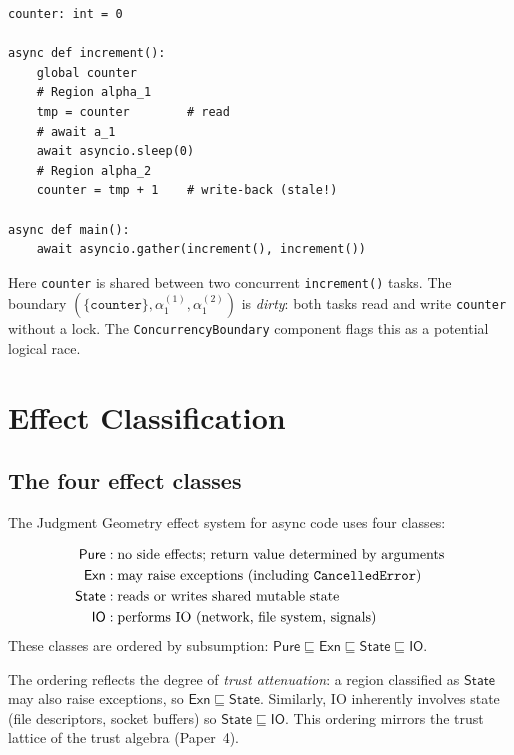 \documentclass[11pt]{article}
\newcommand{\Epure}{\mathsf{Pure}}           %
\newcommand{\Eexn}{\mathsf{Exn}}             %
\newcommand{\Estate}{\mathsf{State}}         %
\newcommand{\Eio}{\mathsf{IO}}               %
\newcommand{\asyncRegion}[1]{\alpha_{#1}}    %
\begin{document}
\begin{example}\label{ex:dirty}
\begin{lstlisting}[style=jugeo-python]
counter: int = 0

async def increment():
    global counter
    # Region alpha_1
    tmp = counter        # read
    # await a_1
    await asyncio.sleep(0)
    # Region alpha_2
    counter = tmp + 1    # write-back (stale!)

async def main():
    await asyncio.gather(increment(), increment())
\end{lstlisting}
Here \texttt{counter} is shared between two concurrent \texttt{increment()}
tasks.  The boundary $({\{\texttt{counter}\}}, \asyncRegion{1}^{(1)},
\asyncRegion{1}^{(2)})$ is \emph{dirty}: both tasks read and write
\texttt{counter} without a lock.  The \texttt{ConcurrencyBoundary} component
flags this as a potential logical race.
\end{example}

\section{Effect Classification}\label{sec:effect-class}

\subsection{The four effect classes}

The Judgment Geometry effect system for async code uses four classes:

\begin{definition}\label{def:effect-classes}
\begin{align*}
  \Epure   &: \text{no side effects; return value determined by arguments}\\
  \Eexn    &: \text{may raise exceptions (including \texttt{CancelledError})}\\
  \Estate  &: \text{reads or writes shared mutable state}\\
  \Eio     &: \text{performs IO (network, file system, signals)}
\end{align*}
These classes are ordered by subsumption:
$\Epure \sqsubseteq \Eexn \sqsubseteq \Estate \sqsubseteq \Eio$.
\end{definition}

\begin{remark}
The ordering reflects the degree of \emph{trust attenuation}: a region
classified as $\Estate$ may also raise exceptions, so $\Eexn \sqsubseteq
\Estate$.  Similarly, IO inherently involves state (file descriptors,
socket buffers) so $\Estate \sqsubseteq \Eio$.  This ordering mirrors the
trust lattice of the \JuGeo{} trust algebra (Paper~4).
\end{remark}
\end{document}
